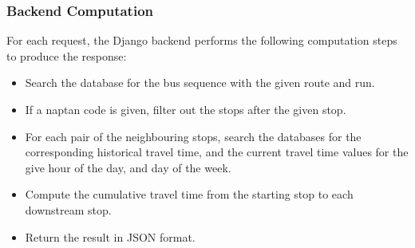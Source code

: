 \subsubsection{Backend Computation}
For each request, the Django backend performs the following computation steps to produce the response:

\begin{itemize}
  \item Search the database for the bus sequence with the given route and run.
  \item If a \gls{naptan} code is given, filter out the stops after the given stop.
  \item For each pair of the neighbouring stops, search the databases for the corresponding historical travel time, and the current travel time values for the give hour of the day, and day of the week.
  \item Compute the cumulative travel time from the starting stop to each downstream stop.
  \item Return the result in JSON format.
\end{itemize}
